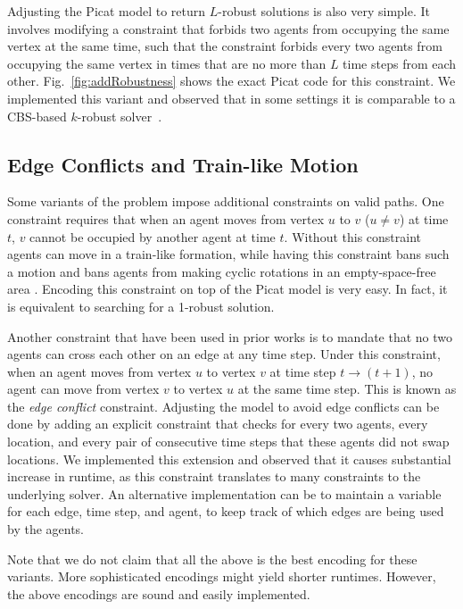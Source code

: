 \documentclass[conference]{IEEEtran}
\begin{document}
Adjusting the Picat model to return $L$-robust solutions is also very simple. 
It involves modifying a constraint that forbids two agents from occupying the same vertex at the same time, such that the constraint forbids every two agents 
from occupying the same vertex in times that are no more than $L$ time steps from each other. Fig.~\ref{fig:addRobustness} shows the exact Picat code for this constraint.
We implemented this variant and observed that in some settings it is comparable to a CBS-based $k$-robust solver~\cite{atzmon2017kRobust}. 


\subsection{Edge Conflicts and Train-like Motion}
Some variants of the problem impose additional constraints on valid paths. 
One constraint requires that when an agent moves from vertex $u$ to $v$ ($u \neq v$) at time $t$, $v$ cannot be occupied by another agent at time $t$. Without this constraint agents can move in a train-like formation, while having this constraint bans such a motion and bans agents from making cyclic rotations in an empty-space-free area \cite{YuL13}. 
Encoding this constraint on top of the Picat model is very easy. In fact, it is equivalent to searching for a 1-robust solution. 

Another constraint that have been used in prior works is to mandate that no two agents can cross each other on an edge at any time step. Under this constraint, when an agent moves from vertex $u$ to vertex $v$ at time step $t \rightarrow (t+1)$, no agent can move from vertex $v$ to vertex $u$ at the same time step. This is known as the {\em edge conflict} constraint. 
Adjusting the model to avoid edge conflicts can be done by adding an explicit constraint that checks for every two agents, every location, and every pair of consecutive time steps that these agents did not swap locations. 
We implemented this extension and observed that it causes substantial increase in runtime, as this constraint translates to many constraints to the underlying solver. 
An alternative implementation can be to maintain a variable for each edge, time step, and agent, to keep track of which edges are being used by the agents. 


Note that we do not claim that all the above is the best encoding
for these variants. More sophisticated encodings might yield shorter runtimes. However, the above encodings are sound 
and easily implemented.
\end{document}
